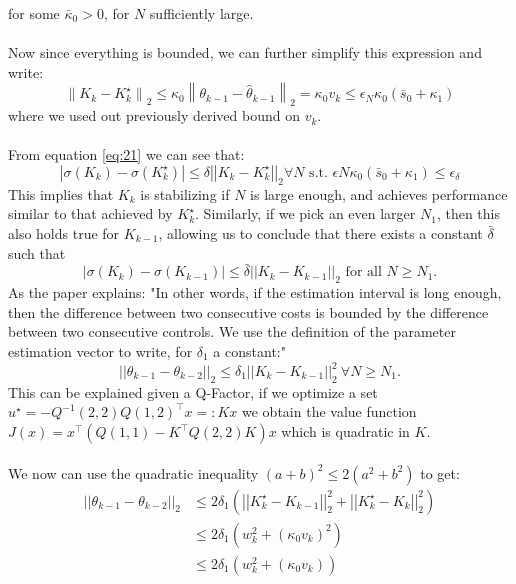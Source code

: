 \documentclass{article}[12pt]
\newcommand{\twonorm}[1]{\left|\left|#1\right|\right|_2}
\begin{document}
for some $\bar{\kappa}_0>0$, for $N$ sufficiently large. \\ \\ 
Now since everything is bounded, we can further simplify this expression and write:
\begin{equation}\label{eq:25}
\left\|K_{k}-K_{k}^{\star}\right\|_{2} \leq \kappa_{0}\left\|\theta_{k-1}-\hat{\theta}_{k-1}\right\|_{2}=\kappa_{0} v_{k} \leq \epsilon_{N} \kappa_{0}\left(\bar{s}_{0}+\kappa_{1}\right)
\end{equation}
where we used out previously derived bound on $v_k$. \\ \\
From equation \eqref{eq:21} we can see that:
\begin{equation} \label{eq:26}
    |\sigma(K_k)-\sigma(K^\star_k)|\leq \delta\twonorm{K_k-K^\star_k} \forall N \text{ s.t. } \epsilon N \kappa_0(\bar{s}_0 + \kappa_1)\leq \epsilon_\delta
\end{equation}
This implies that $K_k$ is stabilizing if $N$ is large enough, and achieves performance similar to that achieved by $K_k^\star$. Similarly, if we pick an even larger $N_1$, then this also holds true for $K_{k-1}$, allowing us to conclude that there exists a constant $\bar \delta$ such that
\begin{equation} \label{eq:27}
|\sigma(K_k) - \sigma(K_{k-1})|\leq \bar \delta\twonorm{K_k - K_{k-1}} \text{ for all $N \geq N_1$.}
\end{equation}
As the paper \cite{Brad94} explains: "In other words, if the estimation interval is long enough, then the difference between two consecutive costs is bounded by the difference between two consecutive controls. We use the definition of the parameter estimation vector to write, for $\delta_1$ a constant:"
\begin{equation}\label{eq:28}
    \twonorm{\theta_{k-1}-\theta_{k-2}}\leq \delta_1\twonorm{K_k-K_{k-1}}^2 \ \forall N \geq N_1.
\end{equation}
This can be explained given a Q-Factor, if we optimize a set $u^{\star}=-Q^{-1}(2,2) Q(1,2)^{\top} x=: K x$ we obtain the value function $J(x)=x^{\top}\left(Q(1,1)-K^{\top} Q(2,2) K\right) x$ which is quadratic in $K$.
\\ \\
We now can use the quadratic inequality $(a+b)^{2} \leq 2\left(a^{2}+b^{2}\right)$ to get:
\begin{equation}\label{eq:29}
\begin{split}
    \twonorm{\theta_{k-1}-\theta_{k-2}} & \leq 2\delta_1\left(\twonorm{K_k^\star - K_{k-1}}^2 + \twonorm{K_k^\star - K_k}^2\right) \\
                                    & \leq 2\delta_1(w_k^2 + (\kappa_0 v_k)^2) \\
                                    & \leq 2\delta_1(w_k^2 + (\kappa_0 v_k))
\end{split}
\end{equation}
\end{document}
